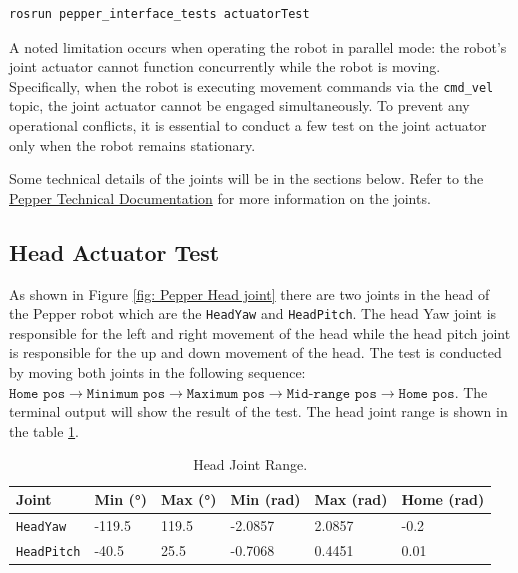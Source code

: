 \documentclass{CSSRforAfrica}
\begin{document}
\begin{lstlisting}[style=withoutNumbering, language=bash]
rosrun pepper_interface_tests actuatorTest
\end{lstlisting}

\begingroup
{}
\begin{tcolorbox}[nobeforeafter,
enhanced,
sharp corners,
toprule=1pt,
bottomrule=1pt,
leftrule=0pt,
rightrule=0pt,
colback=yellow!20,
left skip=\mynote@shift,
right skip=\mynote@shift,
overlay={\node[left] (mynotenode) at ([xshift=-\mynote@shift]frame.west) {\textbf{\textcolor{greenyellow}{Note:}}} ;},]
A noted limitation occurs when operating the robot in parallel mode: the robot's joint actuator cannot function concurrently
while the robot is moving. Specifically, when the robot is executing movement commands via the \texttt{cmd\_vel} topic, the joint actuator
cannot be engaged simultaneously. To prevent any operational conflicts, it is essential to conduct a few test on the joint actuator only when the robot 
remains stationary.
\end{tcolorbox}
\endgroup

Some technical details of the joints will be in the sections below. Refer to the 
\href{http://doc.aldebaran.com/2-5/family/pepper_technical/joints_pep.html}{Pepper Technical Documentation} for more information on the joints.

\subsection{Head Actuator Test}
As shown in Figure \ref{fig: Pepper Head joint} there are two joints in the head of the Pepper robot which are the \texttt{HeadYaw} and \texttt{HeadPitch}.
The head Yaw joint is responsible for the left and right movement of the head while the head pitch joint is responsible for the up and down movement of the head. The test is conducted by moving both joints in the following sequence:
$ \texttt{Home pos} \rightarrow \texttt{Minimum pos} \rightarrow \texttt{Maximum pos} \rightarrow \texttt{Mid-range pos} \rightarrow \texttt{Home pos}$.
The terminal output will show the result of the test. The head joint range is shown in the table \ref{tab:head_joint_range}.

\begin{longtable}[c]{|l|l|l|l|l|l|} 
    \caption{Head Joint Range. \cite{PepperJoints}} \label{tab:head_joint_range}\\
    \hline
    \rowcolor{gray!30}
    \textbf{Joint} & \textbf{Min (°)} & \textbf{Max (°)} & \textbf{Min (rad)} & \textbf{Max (rad)} & \textbf{Home (rad)} \\ \hline
    \endhead %
    
    \texttt{HeadYaw} & -119.5 & 119.5 & -2.0857 & 2.0857 & -0.2 \\ \hline
    \texttt{HeadPitch} & -40.5 & 25.5 & -0.7068 & 0.4451 & 0.01 \\ \hline
    
\end{longtable}
\end{document}
